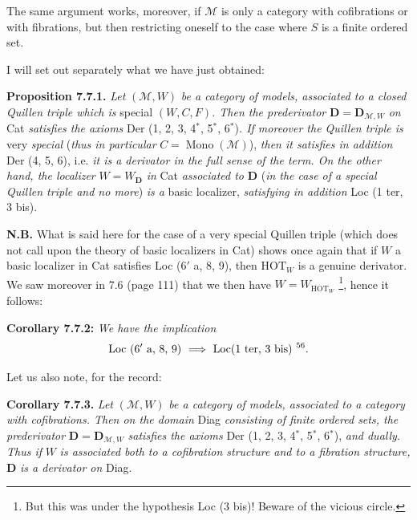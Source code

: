 The same argument works, moreover, if $\mathcal{M}$ is only a category with cofibrations or with fibrations, but then restricting oneself to the case where $S$ is a finite ordered set.

I will set out separately what we have just obtained:

\textbf{Proposition 7.7.1.} \textit{Let} $(\mathcal{M},W)$ \textit{be a category of models, associated to a closed Quillen triple which is} special $(W,C,F)$\textit{. Then the prederivator} $\mathbf{D}=\mathbf{D}_{\mathcal{M},W}$ \textit{on} Cat \textit{satisfies the axioms} Der (1, 2, 3, 4$^*$, 5$^*$, 6$^*$)\textit{. If moreover the Quillen triple is} very \textit{special} (\textit{thus in particular} $C=\operatorname{Mono}(\mathcal{M})$), \textit{then it satisfies in addition} Der (4, 5, 6), i.e. \textit{it is a derivator in the full sense of the term. On the other hand, the localizer} $W=W_{\mathbf{D}}$ \textit{in} Cat \textit{associated to} $\mathbf{D}$ (\textit{in the case of a special Quillen triple and no more}) \textit{is a} basic localizer, \textit{satisfying in addition} Loc (1 ter, 3 bis).

\textbf{N.B.} What is said here for the case of a very special Quillen triple (which does not call upon the theory of basic localizers
in Cat) shows once again that if $W$ a basic localizer in Cat satisfies Loc (6$'$ a, 8, 9), then $\mathrm{HOT}_W$ is a genuine derivator. We saw moreover in 7.6 (page 111) that we then have $W=W_{\mathrm{HOT}_W}$ \footnote[55]{But this was under the hypothesis Loc (3 bis)! Beware of the vicious circle.}, hence it follows:

\textbf{Corollary 7.7.2:} \textit{We have the implication}
\[ \text{Loc } (6'\text{ a, 8, 9})\ \Longrightarrow\ \text{Loc(1 ter, 3 bis)}\ \text{\footnotemark[56]}. \]

Let us also note, for the record:

\textbf{Corollary 7.7.3.} \textit{Let} $(\mathcal{M},W)$ \textit{be a category of models, associated to a category with cofibrations. Then on the domain} Diag \textit{consisting of finite ordered sets, the prederivator} $\mathbf{D}=\mathbf{D}_{\mathcal{M},W}$ \textit{satisfies the axioms} Der (1, 2, 3, 4$^*$, 5$^*$, 6$^*$), \textit{and dually. Thus if} $W$ \textit{is associated both to a cofibration structure and to a fibration structure,} $\mathbf{D}$ \textit{is a derivator on} Diag.

